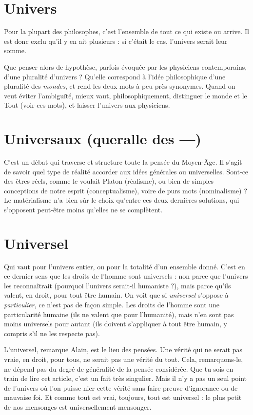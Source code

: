 \section{Univers}
Pour la plupart des philosophes, c’est l’ensemble de tout ce qui
existe ou arrive. Il est donc exclu qu’il y en ait plusieurs : si c’était
le cas, l’univers serait leur somme.

Que penser alors de hypothèse, parfois évoquée par les physiciens contemporains,
d’une pluralité d’univers ? Qu’elle correspond à l’idée philosophique
d’une pluralité des {\it mondes}, et rend les deux mots à peu près synonymes. Quand
on veut éviter l'ambiguïté, mieux vaut, philosophiquement, distinguer le
monde et le Tout (voir ces mots), et laisser l’univers aux physiciens.

\section{Universaux (queralle des —)}
C’est un débat qui traverse et structure
toute la pensée du Moyen-Âge. Il
s’agit de savoir quel type de réalité accorder aux idées générales ou universelles.
Sont-ce des êtres réels, comme le voulait Platon (réalisme), ou bien de simples
conceptions de notre esprit (conceptualisme), voire de purs mots (nominalisme) ?
Le matérialisme n’a bien sûr le choix qu’entre ces deux dernières solutions,
qui s'opposent peut-être moins qu’elles ne se complètent.

\section{Universel}
Qui vaut pour l’univers entier, ou pour la totalité d’un
ensemble donné. C’est en ce dernier sens que les droits de
l’homme sont universels : non parce que l’univers les reconnaîtrait (pourquoi
l'univers serait-il humaniste ?), mais parce qu’ils valent, en droit, pour tout être
humain. On voit que si {\it universel} s'oppose à {\it particulier}, ce n’est pas de façon
simple. Les droits de l’homme sont une particularité humaine (ils ne valent que
pour l'humanité), mais n’en sont pas moins universels pour autant (ils doivent
s'appliquer à tout être humain, y compris s’il ne les respecte pas).

L’universel, remarque Alain, est le lieu des pensées. Une vérité qui ne
serait pas vraie, en droit, pour tous, ne serait pas une vérité du tout. Cela,
remarquons-le, ne dépend pas du degré de généralité de la pensée considérée.
Que tu sois en train de lire cet article, c’est un fait très singulier. Mais
il n’y a pas un seul point de l’univers où l’on puisse nier cette vérité sans
faire preuve d’ignorance ou de mauvaise foi. Et comme tout est vrai, toujours,
tout est universel : le plus petit de nos mensonges est universellement
mensonger.

